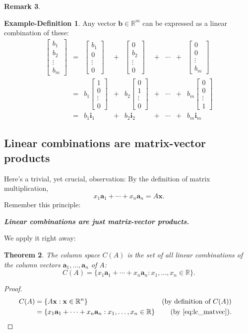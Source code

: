 \documentclass[12pt]{amsart}
\newcommand{\RR}{\mathbb{R}}
\newtheorem{theorem}{Theorem}[section]
\theoremstyle{definition} \newtheorem{definition}[theorem]{Definition}
\newtheorem{remark}[theorem]{Remark} \newtheorem{remarks}[theorem]{Remarks}
\newtheorem{exdef}[theorem]{Example-Definition}
\newcommand{\ba}{\mathbf{a}}
\newcommand{\bb}{\mathbf{b}}
\newcommand{\bi}{\mathbf{i}}
\newcommand{\bx}{\mathbf{x}}
\newcommand{\bas}{\ba_1,\ldots,\ba_n}
\newcommand{\mat}[1]{\begin{bmatrix}#1\end{bmatrix}}
\begin{document}
\begin{remark}
\begin{exdef}
  Any vector $\bb\in\RR^m$ can be expressed as a linear combination of these:
\[
  \begin{array}{rcrcrcccr}
    \mat{b_1\\b_2\\\vdots\\b_m} &=&
\mat{b_1\\0\\\vdots\\0} 
&+& \mat{0\\b_2\\\vdots\\0}
&+& \cdots
&+& \mat{0\\0\\\vdots\\b_m} \\
&=& b_1\mat{1\\0\\\vdots\\0} 
&+& b_2\mat{0\\1\\\vdots\\0}
&+& \cdots
&+& b_m\mat{0\\0\\\vdots\\1} \\
&=& b_1\bi_1 &+& b_2\bi_2 &+&  \cdots  &+& b_m\bi_m
  \end{array}
\]
\end{exdef}

\subsection{Linear combinations are matrix-vector products}
Here's a trivial, yet crucial, observation: By the definition of matrix multiplication,
\begin{equation}\label{eq:lc_matvec}
  x_1\ba_1+\cdots + x_n\ba_n = A\bx. 
\end{equation}
Remember this principle:
\begin{center}
  \textbf{\textit{Linear combinations are just matrix-vector products.}}
\end{center}

We apply it right away:
\begin{theorem}\label{th:col_space_is_set_of_lcs}
  The column space $C(A)$ is the set of all linear combinations of the column vectors $\bas$ of $A$:
  \[
    C(A) = \{x_1\ba_1+\cdots+x_n\ba_n : x_1,\ldots,x_n\in\RR\}.
  \]
\end{theorem}
\begin{proof}
  \begin{align*}
    C(A) &= \{A\bx : \bx\in \RR^n\}& \text{(by definition of $C(A)$)}\\
         &= \{x_1\ba_1 + \cdots + x_n\ba_n : x_1,\ldots,x_n\in \RR\} &\text{(by~\eqref{eq:lc_matvec})}.&\qedhere
  \end{align*}
\end{proof}


\end{remark}
\end{document}
